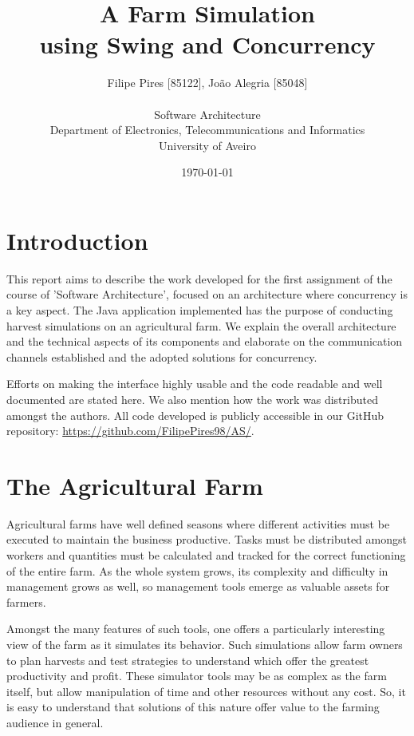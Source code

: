\documentclass[12pt]{article}
\title{A Farm Simulation\\using Swing and Concurrency}
\author
{Filipe Pires [85122], João Alegria [85048]\\
\\
Software Architecture\\
\normalsize{Department of Electronics, Telecommunications and Informatics}\\
\normalsize{University of Aveiro}\\
}
\date{\today{}}
\begin{document}
 

\baselineskip18pt

\maketitle 

\section*{Introduction} %

This report aims to describe the work developed for the first assignment of the course of 'Software Architecture', focused on an architecture where concurrency 
is a key aspect.
The Java application implemented has the purpose of conducting harvest simulations on an agricultural farm.
We explain the overall architecture and the technical aspects of its components and elaborate on the communication channels established and the adopted 
solutions for concurrency.

Efforts on making the interface highly usable and the code readable and well documented are stated here.
We also mention how the work was distributed amongst the authors.
All code developed is publicly accessible in our GitHub repository:
\url{https://github.com/FilipePires98/AS/}.
\newpage

\section{The Agricultural Farm} \label{farm} %

Agricultural farms have well defined seasons where different activities must be executed to maintain the business productive.
Tasks must be distributed amongst workers and quantities must be calculated and tracked for the correct functioning of the entire farm.
As the whole system grows, its complexity and difficulty in management grows as well, so management tools emerge as valuable assets for farmers.

Amongst the many features of such tools, one offers a particularly interesting view of the farm as it simulates its behavior.
Such simulations allow farm owners to plan harvests and test strategies to understand which offer the greatest productivity and profit.
These simulator tools may be as complex as the farm itself, but allow manipulation of time and other resources without any cost.
So, it is easy to understand that solutions of this nature offer value to the farming audience in general.
\end{document}
